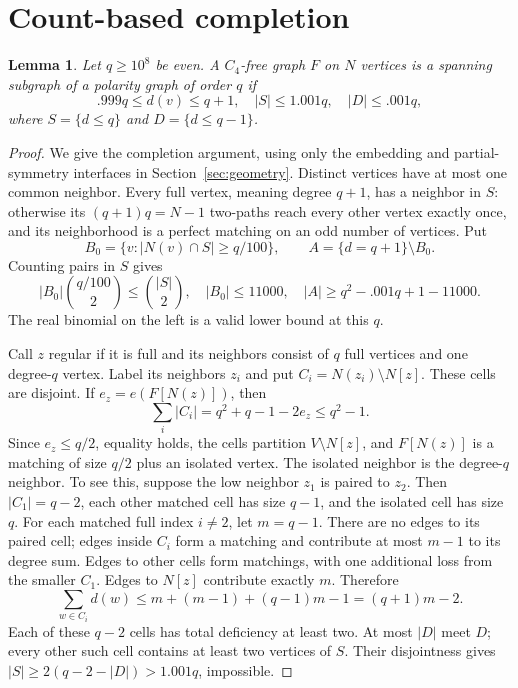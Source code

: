 \documentclass[11pt]{article}
\newtheorem{lemma}[theorem]{Lemma}
\theoremstyle{remark}\newtheorem*{remark}{Remark}
\begin{document}
\section{Count-based completion}\label{sec:completion}
\begin{lemma}\label{lem:completion}
Let $q\geq10^8$ be even. A $C_4$-free graph $F$ on $N$ vertices is a spanning subgraph of a polarity graph of order $q$ if
\[
 .999q\leq d(v)\leq q+1,\quad
 |S|\leq1.001q,\quad |D|\leq.001q,
\]
where $S=\{d\leq q\}$ and $D=\{d\leq q-1\}$.
\end{lemma}
\begin{proof}
We give the completion argument, using only the embedding and partial-symmetry interfaces in Section~\ref{sec:geometry}. Distinct vertices have at most one common neighbor. Every full vertex, meaning degree $q+1$, has a neighbor in $S$: otherwise its $(q+1)q=N-1$ two-paths reach every other vertex exactly once, and its neighborhood is a perfect matching on an odd number of vertices.
Put
\[
 B_0=\{v:|N(v)\cap S|\geq q/100\},\qquad
 A=\{d=q+1\}\setminus B_0.
\]
Counting pairs in $S$ gives
\begin{equation}\label{eq:fullrows}
 |B_0|\binom{q/100}{2}\leq\binom{|S|}{2},\quad
 |B_0|\leq11000,\quad |A|\geq q^2-.001q+1-11000.
\end{equation}
The real binomial on the left is a valid lower bound at this $q$.

Call $z$ regular if it is full and its neighbors consist of $q$ full vertices and one degree-$q$ vertex. Label its neighbors $z_i$ and put $C_i=N(z_i)\setminus N[z]$. These cells are disjoint. If $e_z=e(F[N(z)])$, then
\[
 \sum_i|C_i|=q^2+q-1-2e_z\leq q^2-1.
\]
Since $e_z\leq q/2$, equality holds, the cells partition $V\setminus N[z]$, and $F[N(z)]$ is a matching of size $q/2$ plus an isolated vertex.
The isolated neighbor is the degree-$q$ neighbor. To see this, suppose the low neighbor $z_1$ is paired to $z_2$. Then $|C_1|=q-2$, each other matched cell has size $q-1$, and the isolated cell has size $q$. For each matched full index $i\ne2$, let $m=q-1$. There are no edges to its paired cell; edges inside $C_i$ form a matching and contribute at most $m-1$ to its degree sum. Edges to other cells form matchings, with one additional loss from the smaller $C_1$. Edges to $N[z]$ contribute exactly $m$. Therefore
\[
 \sum_{w\in C_i}d(w)\leq m+(m-1)+(q-1)m-1=(q+1)m-2.
\]
Each of these $q-2$ cells has total deficiency at least two. At most $|D|$ meet $D$; every other such cell contains at least two vertices of $S$. Their disjointness gives $|S|\geq2(q-2-|D|)>1.001q$, impossible.


\end{proof}
\end{document}
